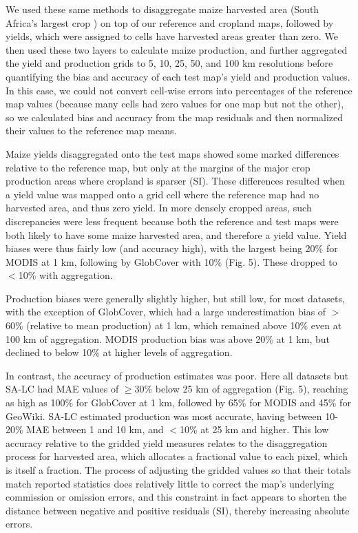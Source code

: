 \documentclass{pnastwo}
\begin{document}
\begin{article}
We used these same methods  \cite{ramankutty_farming_2008,monfreda_farming_2008} to disaggregate maize harvested area (South Africa's largest crop \cite{estes_projected_2013}) on top of our reference and cropland maps, followed by yields, which were assigned to cells have harvested areas greater than zero. We then used these two layers to calculate maize production, and further aggregated the yield and production grids to 5, 10, 25, 50, and 100 km resolutions before quantifying the bias and accuracy of each test map's yield and production values. In this case, we could not convert cell-wise errors into percentages of the reference map values (because many cells had zero values for one map but not the other), so we calculated bias and accuracy from the map residuals and then normalized their values to the reference map means. 

Maize yields disaggregated onto the test maps showed some marked differences relative to the reference map, but only at the margins of the major crop production areas where cropland is sparser (SI). These differences resulted when a yield value was mapped onto a grid cell where the reference map had no harvested area, and thus zero yield. In more densely cropped areas, such discrepancies were less frequent because both the reference and test maps were both likely to have some maize harvested area, and therefore a yield value.  Yield biases were thus fairly low (and accuracy high), with the largest being 20\% for MODIS at 1 km, following by GlobCover with 10\% (Fig. 5). These dropped to $<$10\% with aggregation.  

Production biases were generally slightly higher, but still low, for most datasets, with the exception of GlobCover, which had a large underestimation bias of $>$60\% (relative to mean production) at 1 km, which remained above 10\% even at 100 km of aggregation. MODIS production bias was above 20\% at 1 km, but declined to below 10\% at higher levels of aggregation.  

In contrast, the accuracy of production estimates was poor. Here all datasets but SA-LC had MAE values of $\geq$30\% below 25 km of aggregation (Fig. 5), reaching as high as 100\% for GlobCover at 1 km, followed by 65\% for MODIS and 45\% for GeoWiki. SA-LC estimated production was most accurate, having between 10-20\% MAE between 1 and 10 km, and $<$10\% at 25 km and higher.  This low accuracy relative to the gridded yield measures relates to the disaggregation process for harvested area, which allocates a fractional value to each pixel, which is itself a fraction. The process of adjusting the gridded values so that their totals match reported statistics does relatively little to correct the map's underlying commission or omission errors, and this constraint in fact appears to shorten the distance between negative and positive residuals (SI), thereby increasing absolute errors.  


\end{article}
\end{document}
